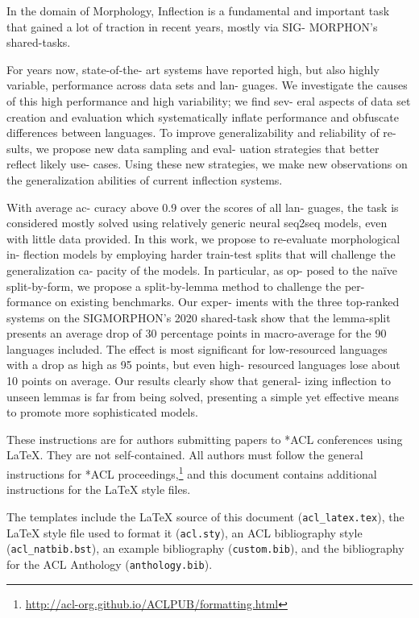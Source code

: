 \documentclass[11pt]{article}
\begin{document}
In the domain of Morphology, Inflection is a fundamental and important task that gained a lot of traction in recent years, mostly via SIG- MORPHON’s shared-tasks. 




For years now, state-of-the- art systems have reported high, but also highly variable, performance across data sets and lan- guages. We investigate the causes of this high performance and high variability; we find sev- eral aspects of data set creation and evaluation which systematically inflate performance and obfuscate differences between languages. To improve generalizability and reliability of re- sults, we propose new data sampling and eval- uation strategies that better reflect likely use- cases. Using these new strategies, we make new observations on the generalization abilities of current inflection systems.

With average ac- curacy above 0.9 over the scores of all lan- guages, the task is considered mostly solved using relatively generic neural seq2seq models, even with little data provided. In this work, we propose to re-evaluate morphological in- flection models by employing harder train-test splits that will challenge the generalization ca- pacity of the models. In particular, as op- posed to the naïve split-by-form, we propose a split-by-lemma method to challenge the per- formance on existing benchmarks. Our exper- iments with the three top-ranked systems on the SIGMORPHON’s 2020 shared-task show that the lemma-split presents an average drop of 30 percentage points in macro-average for the 90 languages included. The effect is most significant for low-resourced languages with a drop as high as 95 points, but even high- resourced languages lose about 10 points on average. Our results clearly show that general- izing inflection to unseen lemmas is far from being solved, presenting a simple yet effective means to promote more sophisticated models.





These instructions are for authors submitting papers to *ACL conferences using \LaTeX. They are not self-contained. All authors must follow the general instructions for *ACL proceedings,\footnote{\url{http://acl-org.github.io/ACLPUB/formatting.html}} and this document contains additional instructions for the \LaTeX{} style files.

The templates include the \LaTeX{} source of this document (\texttt{acl\_latex.tex}),
the \LaTeX{} style file used to format it (\texttt{acl.sty}),
an ACL bibliography style (\texttt{acl\_natbib.bst}),
an example bibliography (\texttt{custom.bib}),
and the bibliography for the ACL Anthology (\texttt{anthology.bib}).
\end{document}
